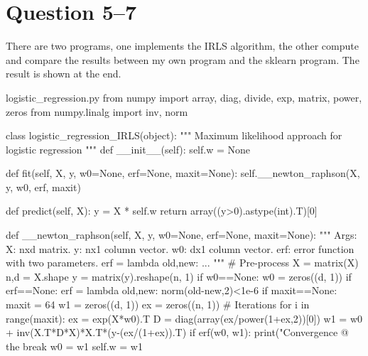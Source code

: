 \documentclass{article}
\begin{document}
\section{Question 5--7}\label{S:5-7}
There are two  programs, one implements the IRLS algorithm, the other compute and compare the results between my own program and the sklearn program. The result is shown at the end.
\begin{PyListing}{logistic\_regression.py}
from numpy import array, diag, divide, exp, matrix, power, zeros
from numpy.linalg import inv, norm


class logistic_regression_IRLS(object):
    """
    Maximum likelihood approach for logistic regression
    """
    def __init__(self):
        self.w = None

    def fit(self, X, y, w0=None, erf=None, maxit=None):
        self.__newton_raphson(X, y, w0, erf, maxit)

    def predict(self, X):
        y = X * self.w
        return array((y>0).astype(int).T)[0]
        
    def __newton_raphson(self, X, y, w0=None, erf=None, maxit=None):
        """
        Args:
            X:   nxd matrix.
            y:   nx1 column vector.
            w0:  dx1 column vector.
            erf: error function with two parameters.
                 erf = lambda old,new: ...
        """
        # Pre-process
        X   = matrix(X)
        n,d = X.shape
        y   = matrix(y).reshape(n, 1)
        if w0==None:
            w0 = zeros((d, 1))
        if erf==None:
            erf = lambda old,new: norm(old-new,2)<1e-6
        if maxit==None:
            maxit = 64
        w1 = zeros((d, 1))
        ex = zeros((n, 1))
        # Iterations
        for i in range(maxit):
            ex = exp(X*w0).T
            D  = diag(array(ex/power(1+ex,2))[0])
            w1 = w0 + inv(X.T*D*X)*X.T*(y-(ex/(1+ex)).T)
            if erf(w0, w1):
                print("Convergence @ the %
                break
            w0 = w1
        self.w = w1
\end{PyListing}
\end{document}
